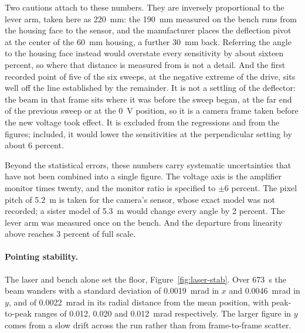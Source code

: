 \documentclass{article}
\begin{document}
Two cautions attach to these numbers. They are inversely proportional to the lever arm, taken
here as 220~mm: the 190~mm measured on the bench runs from the housing face to the sensor, and
the manufacturer places the deflection pivot at the center of the 60~mm housing, a further
30~mm back. Referring the angle to the housing face instead would overstate every sensitivity by
about sixteen percent, so where that distance is measured from is not a detail. And the first
recorded point of five of the six sweeps, at the negative extreme of the drive, sits well off the
line established by the remainder. It is not a settling of the deflector: the beam in that frame
sits where it was before the sweep began, at the far end of the previous sweep or at the 0~V
position, so it is a camera frame taken before the new voltage took effect. It is excluded from
the regressions and from the figures; included, it would lower the sensitivities at the
perpendicular setting by about 6 percent.

Beyond the statistical errors, these numbers carry systematic uncertainties that have not been
combined into a single figure. The voltage axis is the amplifier monitor times twenty, and the
monitor ratio is specified to $\pm6$ percent. The pixel pitch of 5.2~\textmu m is taken for the
camera's sensor, whose exact model was not recorded; a sister model of 5.3~\textmu m would change
every angle by 2 percent. The lever arm was measured once on the bench. And the departure from
linearity above reaches 3 percent of full scale.

\paragraph{Pointing stability.}
The laser and bench alone set the floor, Figure~\ref{fig:laser-stab}. Over 673~s the beam wanders
with a standard deviation of 0.0019~mrad in $x$ and 0.0046~mrad in $y$, and of 0.0022~mrad in its
radial distance from the mean position, with peak-to-peak ranges of 0.012, 0.020 and 0.012~mrad
respectively. The larger figure in $y$
comes from a slow drift across the run rather than from frame-to-frame scatter.
\end{document}
